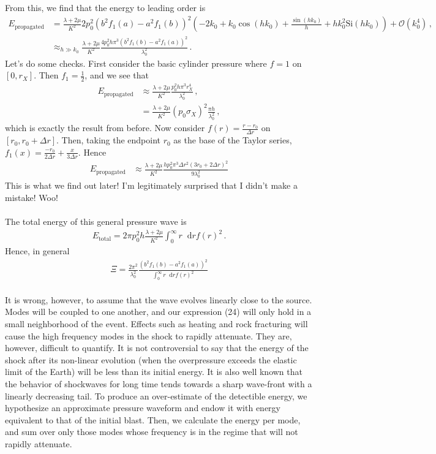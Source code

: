 \documentclass{article}
\newcommand*\diff{\mathop{}\!\mathrm{d}}
\newcommand*\scr[1]{\mathscr{#1}}
\newcommand*\te[1]{\text{#1}}
\newcommand*\p[1]{\left(#1\right)}
\newcommand*\f[2]{\frac{#1}{#2}}
\begin{document}
From this, we find that the energy to leading order is
\begin{align}
E_{\te{propagated}}&=\f{\lambda+2\mu}{K^2}2p_0^2(b^2f_1(a)-a^2f_1(b))^2\p{-2k_0+k_0\cos(h k_0)+\f{\sin(h k_0)}{h}+h k_0^2\te{Si}(h k_0)}+\scr O(k_0^4)\,,\\
&\approx_{h\gg k_0}\f{\lambda+2\mu}{K^2} \f{4 p_0^2h\pi^3(b^2 f_1(b)-a^2f_1(a))^2}{\lambda_0^2}\,.
\end{align}
Let's do some checks. First consider the basic cylinder pressure where $f=1$ on $[0,r_X]$. Then $f_1=\f12$, and we see that
\begin{align}
E_{\te{propagated}}&\approx\f{\lambda+2\mu}{K^2}\f{p_0^2h\pi^3r_X^4}{\lambda_0^2}\,,\\
&=\f{\lambda+2\mu}{K^2}(p_0\sigma_X)^2\f{\pi h}{\lambda_0^2}\,,
\end{align}
which is exactly the result from before. Now consider $f(r)=\f{r-r_0}{\Delta r}$ on $[r_0,r_0+\Delta r]$. Then, taking the endpoint $r_0$ as the base of the Taylor series, $f_1(x)=\f{-r_0}{2\Delta r}+\f{x}{3\Delta r}$. Hence
\begin{align}
E_{\te{propagated}}&\approx\f{\lambda+2\mu}{K^2}\f{h p_0^2\pi^3\Delta r^2(3r_0+2\Delta r)^2}{9\lambda_0^2}
\end{align}
This is what we find out later! I'm legitimately surprised that I didn't make a mistake! Woo!
\\\\
The total energy of this general pressure wave is
\begin{align}
E_{\te{total}} = 2\pi p_0^2h\f{\lambda+2\mu}{K^2}\int_0^\infty r\diff r f(r)^2\,.
\end{align}
Hence, in general
\begin{align}
\Xi = \f{2\pi^2}{\lambda_0^2}\f{(b^2 f_1(b)-a^2f_1(a))^2}{\int_0^\infty r\diff r f(r)^2}
\end{align}
\pagebreak
\\
It is wrong, however, to assume that the wave evolves linearly close to the source. Modes will be coupled to one another, and our expression (24) will only hold in a small neighborhood of the event. Effects such as heating and rock fracturing will cause the high frequency modes in the shock to rapidly attenuate. They are, however, difficult to quantify. It is not controversial to say that the energy of the shock after its non-linear evolution (when the overpressure exceeds the elastic limit of the Earth) will be less than its initial energy. It is also well known that the behavior of shockwaves for long time tends towards a sharp wave-front with a linearly decreasing tail. To produce an over-estimate of the detectible energy, we hypothesize an approximate pressure waveform and endow it with energy equivalent to that of the initial blast. Then, we calculate the energy per mode, and sum over only those modes whose frequency is in the regime that will not rapidly attenuate.
\end{document}
